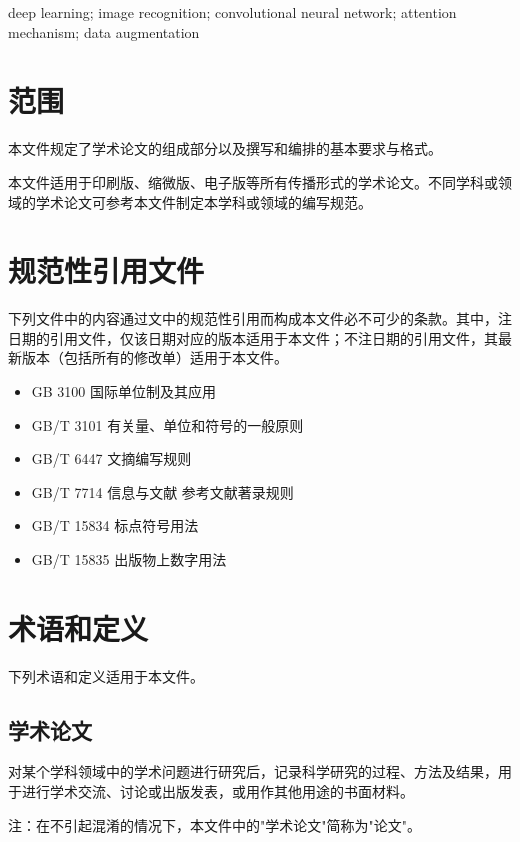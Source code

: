 \documentclass[a4paper,12pt]{ctexart}
\newcommand{\enkeywords}[1]{
    \vspace{1em}
    \noindent{\textbf{\zihao{5} Keywords: }}
    \zihao{5} #1
}
\begin{document}
\enkeywords{deep learning; image recognition; convolutional neural network; attention mechanism; data augmentation}

\newpage
\tableofcontents

\newpage
\setcounter{page}{1}

\section{范围}

本文件规定了学术论文的组成部分以及撰写和编排的基本要求与格式。

本文件适用于印刷版、缩微版、电子版等所有传播形式的学术论文。不同学科或领域的学术论文可参考本文件制定本学科或领域的编写规范。

\section{规范性引用文件}

下列文件中的内容通过文中的规范性引用而构成本文件必不可少的条款。其中，注日期的引用文件，仅该日期对应的版本适用于本文件；不注日期的引用文件，其最新版本（包括所有的修改单）适用于本文件。

\begin{itemize}[leftmargin=2em]
\item GB 3100 国际单位制及其应用
\item GB/T 3101 有关量、单位和符号的一般原则
\item GB/T 6447 文摘编写规则
\item GB/T 7714 信息与文献 参考文献著录规则
\item GB/T 15834 标点符号用法
\item GB/T 15835 出版物上数字用法
\end{itemize}

\section{术语和定义}

下列术语和定义适用于本文件。

\subsection{学术论文}

对某个学科领域中的学术问题进行研究后，记录科学研究的过程、方法及结果，用于进行学术交流、讨论或出版发表，或用作其他用途的书面材料。

注：在不引起混淆的情况下，本文件中的"学术论文"简称为"论文"。
\end{document}
